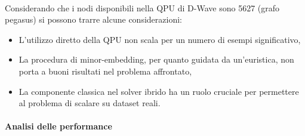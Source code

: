 \documentclass[12pt]{article}
\begin{document}
\begin{figure}[H]
  \centering
  \quad
  \\
  \quad
\end{figure}

Considerando che i nodi disponibili nella QPU di D-Wave sono 5627 (grafo pegasus) si possono trarre alcune considerazioni:
\begin{itemize}
  \item L'utilizzo diretto della QPU non scala per un numero di esempi significativo,
  \item La procedura di minor-embedding, per quanto guidata da un'euristica, non porta a buoni risultati nel problema affrontato,
  \item La componente classica nel solver ibrido ha un ruolo cruciale per permettere al problema di scalare su dataset reali.
\end{itemize}

\paragraph{Analisi delle performance}
\end{document}
